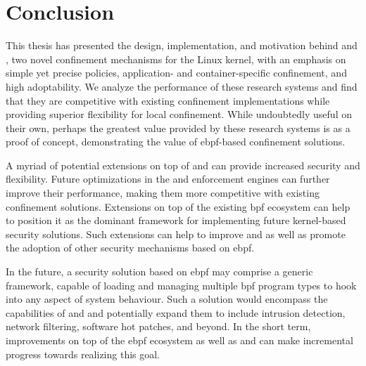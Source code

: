 \section{Conclusion}
\label{s:disc-conclusion}

This thesis has presented the design, implementation, and motivation behind \bpfbox{} and
\bpfcontain{}, two novel confinement mechanisms for the Linux kernel, with an emphasis on
simple yet precise policies, application- and container-specific confinement, and high
adoptability. We analyze the performance of these research systems and find that they are
competitive with existing confinement implementations while providing superior flexibility
for local confinement. While undoubtedly useful on their own, perhaps the greatest value
provided by these research systems is as a proof of concept, demonstrating the value of
\gls{ebpf}-based confinement solutions.

A myriad of potential extensions on top of \bpfbox{} and \bpfcontain{} can provide
increased security and flexibility.  Future optimizations in the \bpfbox{} and
\bpfcontain{} enforcement engines can further improve their performance, making them more
competitive with existing confinement solutions. Extensions on top of the existing
\gls{bpf} ecosystem can help to position it as the dominant framework for implementing
future kernel-based security solutions. Such extensions can help to improve \bpfbox{} and
\bpfcontain{} as well as promote the adoption of other security mechanisms based on
\gls{ebpf}.

In the future, a security solution based on \gls{ebpf} may comprise a generic framework,
capable of loading and managing multiple \gls{bpf} program types to hook into any aspect
of system behaviour. Such a solution would encompass the capabilities of \bpfbox{} and
\bpfcontain{} and potentially expand them to include intrusion detection, network
filtering, software hot patches, and beyond. In the short term, improvements on top of the
\gls{ebpf} ecosystem as well as \bpfbox{} and \bpfcontain{} can make incremental progress
towards realizing this goal.
